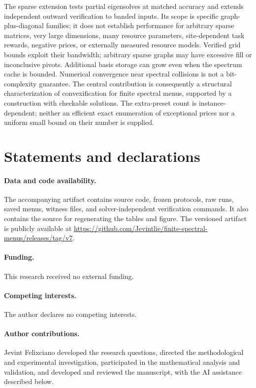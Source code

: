 \documentclass[11pt]{article}
\begin{document}
The sparse extension tests partial eigensolves at matched accuracy and
extends independent outward verification to banded inputs. Its scope
is specific graph-plus-diagonal families; it does not establish performance
for arbitrary sparse matrices, very large dimensions, many resource
parameters, site-dependent task rewards, negative prices, or externally
measured resource models. Verified grid bounds exploit their bandwidth;
arbitrary sparse graphs may have excessive fill or inconclusive pivots.
Additional basis storage
can grow even when the spectrum cache is bounded. Numerical convergence
near spectral collisions is not a bit-complexity guarantee. The central contribution is consequently a structural characterization
of convexification for finite spectral menus, supported by a construction
with checkable solutions. The extra-preset count is instance-dependent;
neither an efficient exact enumeration of exceptional prices nor a uniform
small bound on their number is supplied.

\section*{Statements and declarations}
\paragraph{Data and code availability.}
The accompanying artifact contains source code, frozen protocols, raw runs,
saved menus, witness files, and solver-independent verification commands.
It also contains the source for regenerating the tables and figure. The
versioned artifact is publicly available at
\url{https://github.com/Jevintlie/finite-spectral-menus/releases/tag/v7}.

\paragraph{Funding.} This research received no external funding.
\paragraph{Competing interests.} The author declares no competing interests.
\paragraph{Author contributions.} Jevint Felixciano developed the research
questions, directed the methodological and experimental investigation,
participated in the mathematical analysis and validation, and developed and
reviewed the manuscript, with the AI assistance described below.
\end{document}

